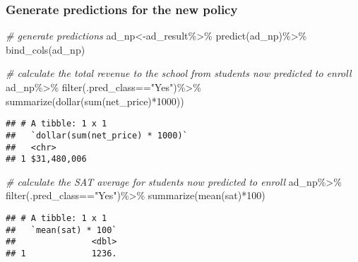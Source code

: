 \documentclass[
]{article}
\newenvironment{Shaded}{\begin{snugshade}}{\end{snugshade}}
\newcommand{\CommentTok}[1]{\textcolor[rgb]{0.56,0.35,0.01}{\textit{#1}}}
\newcommand{\DecValTok}[1]{\textcolor[rgb]{0.00,0.00,0.81}{#1}}
\newcommand{\FunctionTok}[1]{\textcolor[rgb]{0.00,0.00,0.00}{#1}}
\newcommand{\NormalTok}[1]{#1}
\newcommand{\OtherTok}[1]{\textcolor[rgb]{0.56,0.35,0.01}{#1}}
\newcommand{\SpecialCharTok}[1]{\textcolor[rgb]{0.00,0.00,0.00}{#1}}
\newcommand{\StringTok}[1]{\textcolor[rgb]{0.31,0.60,0.02}{#1}}
\begin{document}
\hypertarget{generate-predictions-for-the-new-policy}{%
\subsubsection{Generate predictions for the new
policy}\label{generate-predictions-for-the-new-policy}}

\begin{Shaded}
\begin{Highlighting}[]
\CommentTok{\# generate predictions}
\NormalTok{ad\_np}\OtherTok{\textless{}{-}}\NormalTok{ad\_result}\SpecialCharTok{\%\textgreater{}\%}
  \FunctionTok{predict}\NormalTok{(ad\_np)}\SpecialCharTok{\%\textgreater{}\%}
  \FunctionTok{bind\_cols}\NormalTok{(ad\_np)}
\end{Highlighting}
\end{Shaded}

\begin{Shaded}
\begin{Highlighting}[]
\CommentTok{\# calculate the total revenue to the school from students now predicted to enroll}
\NormalTok{ad\_np}\SpecialCharTok{\%\textgreater{}\%}
  \FunctionTok{filter}\NormalTok{(.pred\_class}\SpecialCharTok{==}\StringTok{"Yes"}\NormalTok{)}\SpecialCharTok{\%\textgreater{}\%}
  \FunctionTok{summarize}\NormalTok{(}\FunctionTok{dollar}\NormalTok{(}\FunctionTok{sum}\NormalTok{(net\_price)}\SpecialCharTok{*}\DecValTok{1000}\NormalTok{))}
\end{Highlighting}
\end{Shaded}

\begin{verbatim}
## # A tibble: 1 x 1
##   `dollar(sum(net_price) * 1000)`
##   <chr>                          
## 1 $31,480,006
\end{verbatim}

\begin{Shaded}
\begin{Highlighting}[]
\CommentTok{\# calculate the SAT average for students now predicted to enroll}
\NormalTok{ad\_np}\SpecialCharTok{\%\textgreater{}\%}
  \FunctionTok{filter}\NormalTok{(.pred\_class}\SpecialCharTok{==}\StringTok{"Yes"}\NormalTok{)}\SpecialCharTok{\%\textgreater{}\%}
  \FunctionTok{summarize}\NormalTok{(}\FunctionTok{mean}\NormalTok{(sat)}\SpecialCharTok{*}\DecValTok{100}\NormalTok{)}
\end{Highlighting}
\end{Shaded}

\begin{verbatim}
## # A tibble: 1 x 1
##   `mean(sat) * 100`
##               <dbl>
## 1             1236.
\end{verbatim}
\end{document}

